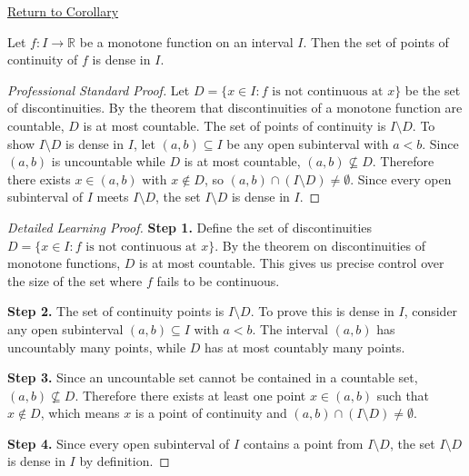 \newpage
{}
\label{prf:monotone-continuous-on-dense-set}

\begin{remark*}[Return]
\hyperref[cor:monotone-continuous-on-dense-set]{Return to Corollary}
\end{remark*}

\begin{corollary*}
Let $f : I \to \mathbb{R}$ be a monotone function on an interval $I$. Then the set of points of continuity of $f$ is dense in $I$.
\end{corollary*}

\begin{proof}[Professional Standard Proof]
\LRAProofBodyStart
Let $D = \{x \in I : f \text{ is not continuous at } x\}$ be the set of discontinuities. By the theorem that discontinuities of a monotone function are countable, $D$ is at most countable. The set of points of continuity is $I \setminus D$. To show $I \setminus D$ is dense in $I$, let $(a, b) \subseteq I$ be any open subinterval with $a < b$. Since $(a, b)$ is uncountable while $D$ is at most countable, $(a, b) \not\subseteq D$. Therefore there exists $x \in (a, b)$ with $x \notin D$, so $(a, b) \cap (I \setminus D) \neq \emptyset$. Since every open subinterval of $I$ meets $I \setminus D$, the set $I \setminus D$ is dense in $I$.
\end{proof}

\begin{proof}[Detailed Learning Proof]
\LRAProofBodyStart

\textbf{Step 1.} Define the set of discontinuities $D = \{x \in I : f \text{ is not continuous at } x\}$. By the theorem on discontinuities of monotone functions, $D$ is at most countable. This gives us precise control over the size of the set where $f$ fails to be continuous.

\textbf{Step 2.} The set of continuity points is $I \setminus D$. To prove this is dense in $I$, consider any open subinterval $(a, b) \subseteq I$ with $a < b$. The interval $(a, b)$ has uncountably many points, while $D$ has at most countably many points.

\textbf{Step 3.} Since an uncountable set cannot be contained in a countable set, $(a, b) \not\subseteq D$. Therefore there exists at least one point $x \in (a, b)$ such that $x \notin D$, which means $x$ is a point of continuity and $(a, b) \cap (I \setminus D) \neq \emptyset$.

\textbf{Step 4.} Since every open subinterval of $I$ contains a point from $I \setminus D$, the set $I \setminus D$ is dense in $I$ by definition.
\end{proof}

